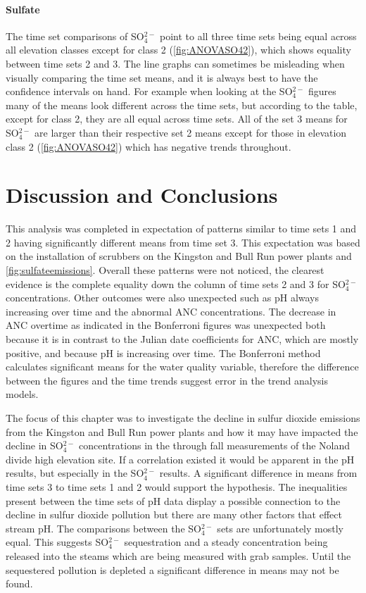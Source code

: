 \paragraph{Sulfate}

The time set comparisons of SO$_4^{2-}$ point to all three time sets being equal across all elevation classes except for class 2 (\autoref{fig:ANOVASO42}), which shows equality between time sets 2 and 3.  
The line graphs can sometimes be misleading when visually comparing the time set means, and it is always best to have the confidence intervals on hand.
For example when looking at the SO$_4^{2-}$ figures many of the means look different across the time sets, but according to the table, except for class 2, they are all equal across time sets.
All of the set 3 means for SO$_4^{2-}$ are larger than their respective set 2 means except for those in elevation class 2 (\autoref{fig:ANOVASO42}) which has negative trends throughout.

\section{Discussion and Conclusions}
This analysis was completed in expectation of patterns similar to time sets 1 and 2 having significantly different means from time set 3.
This expectation was based on the installation of scrubbers on the Kingston and Bull Run power plants and \autoref{fig:sulfateemissions}.
Overall these patterns were not noticed, the clearest evidence is the complete equality down the column of time sets 2 and 3 for SO$_4^{2-}$ concentrations.
Other outcomes were also unexpected such as pH always increasing over time and the abnormal ANC concentrations.
The decrease in ANC overtime as indicated in the Bonferroni figures was unexpected both because it is in contrast to the Julian date coefficients for ANC, which are mostly positive, and because pH is increasing over time.
The Bonferroni method calculates significant means for the water quality variable, therefore the difference between the figures and the time trends suggest error in the trend analysis models.

The focus of this chapter was to investigate the decline in sulfur dioxide emissions from the Kingston and Bull Run power plants and how it may have impacted the decline in SO$_4^{2-}$  concentrations in the through fall measurements of the Noland divide high elevation site.
If a correlation existed it would be apparent in the pH results, but especially in the SO$_4^{2-}$ results.
A significant difference in means from time sets 3 to time sets 1 and 2 would support the hypothesis.
The inequalities present between the time sets of pH data display a possible connection to the decline in sulfur dioxide pollution but there are many other factors that effect stream pH.
The comparisons between the SO$_4^{2-}$ sets are unfortunately mostly equal.
This suggests SO$_4^{2-}$ sequestration and a steady concentration being released into the steams which are being measured with grab samples.
Until the sequestered pollution is depleted a significant difference in means may not be found.
